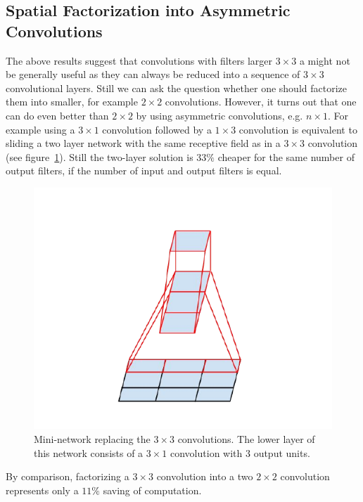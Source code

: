 \subsection{Spatial Factorization into Asymmetric Convolutions}
The above results suggest that convolutions with filters larger
$3\times 3$  a might
not be generally useful as they can always be reduced into a sequence of
$3\times 3$ convolutional layers.
Still we can ask the question whether one should factorize them into smaller,
for example $2\times 2$ convolutions.
However, it turns out that one can do even better than $2\times 2$
by using asymmetric convolutions, e.g. $n\times 1$.
For example using a $3\times 1$ convolution followed by a $1\times 3$
convolution is equivalent to sliding a two layer network with the same
receptive field as in a $3\times 3$ convolution (see figure~\ref{fig:double31}).
Still the two-layer solution is $33\%$ cheaper for the same number of
output filters, if the number of input and output filters is equal.
\begin{figure}
\centering
\includegraphics[width=\linewidth]{double31}
\caption{Mini-network replacing the $3\times 3$ convolutions.
  The lower layer of this network consists of a $3\times 1$ convolution with
  $3$ output units.}
\label{fig:double31}
\end{figure}
By comparison, factorizing a $3\times 3$
convolution into a two $2\times 2$ convolution represents only a $11\%$ saving
of computation.
